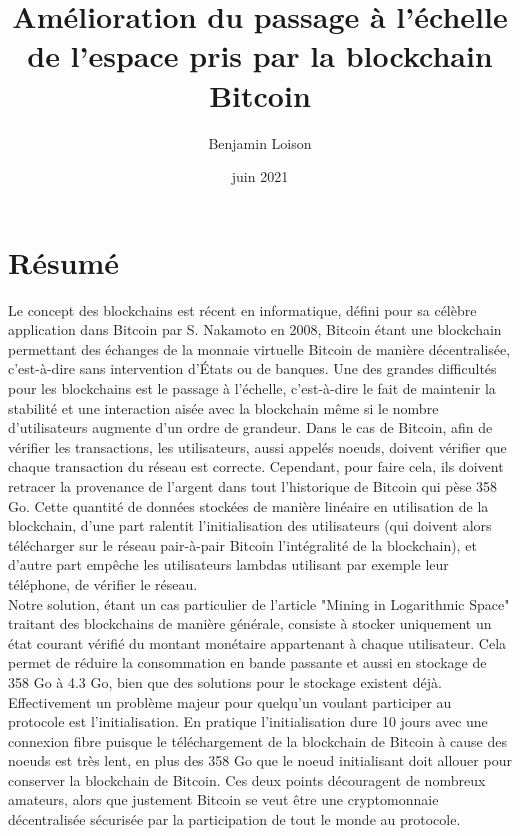 \documentclass[12pt,a4paper]{article}
\begin{document}
	\title{Amélioration du passage à l'échelle de l'espace pris par la blockchain Bitcoin} %
	\author{Benjamin Loison}
	\date{juin 2021}
	\maketitle

	
	\section{Résumé}
	
	Le concept des blockchains est récent en informatique, défini pour sa célèbre application dans Bitcoin par S. Nakamoto en 2008, Bitcoin étant une blockchain permettant des échanges de la monnaie virtuelle Bitcoin de manière décentralisée, c'est-à-dire sans intervention d'États ou de banques. Une des grandes difficultés pour les blockchains est le passage à l'échelle, c'est-à-dire le fait de maintenir la stabilité et une interaction aisée avec la blockchain même si le nombre d'utilisateurs augmente d'un ordre de grandeur. Dans le cas de Bitcoin, afin de vérifier les transactions, les utilisateurs, aussi appelés noeuds, doivent vérifier que chaque transaction du réseau est correcte. Cependant, pour faire cela, ils doivent retracer la provenance de l'argent dans tout l'historique de Bitcoin qui pèse 358 Go. Cette quantité de données stockées de manière linéaire en utilisation de la blockchain, d'une part ralentit l'initialisation des utilisateurs (qui doivent alors télécharger sur le réseau pair-à-pair Bitcoin l'intégralité de la blockchain), et d'autre part empêche les utilisateurs lambdas utilisant par exemple leur téléphone, de vérifier le réseau.\\
  Notre solution, étant un cas particulier de l'article "Mining in Logarithmic Space" traitant des blockchains de manière générale, consiste à stocker uniquement un état courant vérifié du montant monétaire appartenant à chaque utilisateur. Cela permet de réduire la consommation en bande passante et aussi en stockage de 358 Go à 4.3 Go, bien que des solutions pour le stockage existent déjà. Effectivement un problème majeur pour quelqu'un voulant participer au protocole est l'initialisation. En pratique l'initialisation dure 10 jours avec une connexion fibre puisque le téléchargement de la blockchain de Bitcoin à cause des noeuds est très lent, en plus des 358 Go que le noeud initialisant doit allouer pour conserver la blockchain de Bitcoin. Ces deux points découragent de nombreux amateurs, alors que justement Bitcoin se veut être une cryptomonnaie décentralisée sécurisée par la participation de tout le monde au protocole.\\
\end{document}
